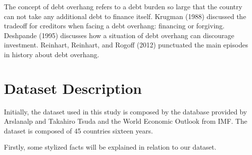 \documentclass[]{article}
\begin{document}
The concept of debt overhang refers to a debt burden so large that the
country can not take any additional debt to finance itself. Krugman
(1988) discussed the tradeoff for creditors when facing a debt overhang:
financing or forgiving. Deshpande (1995) discusses how a situation of
debt overhang can discourage investment. Reinhart, Reinhart, and Rogoff
(2012) punctuated the main episodes in history about debt overhang.

\section{Dataset Description}\label{dataset-description}

Initially, the dataset used in this study is composed by the database
provided by Arslanalp and Takahiro Tsuda and the World Economic Outlook
from IMF. The dataset is composed of 45 countries sixteen years.

Firstly, some stylized facts will be explained in relation to our
dataset.
\end{document}
